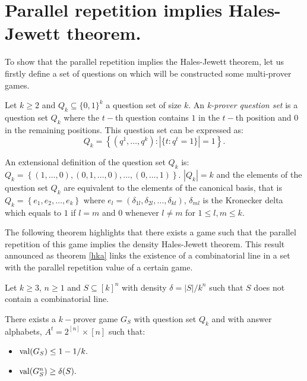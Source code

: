 \section{Parallel repetition implies Hales-Jewett theorem.}
 
To show that the parallel repetition implies the Hales-Jewett theorem, let us firstly define a set of questions on which will be constructed some multi-prover games.

\begin{defn}Let $k\geq 2$ and $Q_k \subseteq \{0,1\}^k$ a question set of size $k.$ An \textit{k-prover question set} is a question set $Q_k$ where the $t-$th question contains $1$ in the $t-$th position and $0$ in the remaining positions. This question set can be expressed as:
$$Q_k=\left\lbrace(q^1, \ldots, q^k): |\{t:q^t=1\}|=1\right\rbrace.$$		\end{defn}
 
 An extensional definition of the question set $Q_k$ is: $Q_k=\left\lbrace (1,\ldots,0), (0,1,\ldots,0), \ldots, (0,\ldots,1) \right\rbrace.$ $|Q_k|=k$ and the elements of the question set $Q_k$ are equivalent to the elements of the canonical basis, that is $Q_k= \left\lbrace e_1, e_2, \ldots, e_k\right\rbrace$ where $e_l=(\delta_{1l}, \delta_{2l}, \ldots, \delta_{kl} )$, $\delta_{ml}$ is the Kronecker delta which equals to $1$ if $l=m$ and $0$ whenever $l \neq m$ for $1 \leq l, m \leq  k.$ 

The following theorem highlights that there exists a game such that the parallel repetition of this game  implies the density Hales-Jewett theorem. This result announced as theorem \eqref{hka} links the existence of a combinatorial line in a set with the parallel repetition value of a certain game.

 \begin{thm} Let $k\geq 3$, $n\geq 1$ and $S\subseteq [k]^n$ with density $\delta=|S|/k^n$ such that $S$ does not contain a combinatorial line.	
 
There exists a $k-$prover game $G_S$ with question set $Q_k$ and with answer alphabets,
$A^t = 2^{[n]} \times [n]$ such that:
\begin{itemize}
\item $\mathrm{val} (G_S) \leq 1-1/k.$ 	\item $\mathrm{val} (G_S^n) \geq \delta(S).$
\end{itemize} \label{hka}
 	\end{thm}

